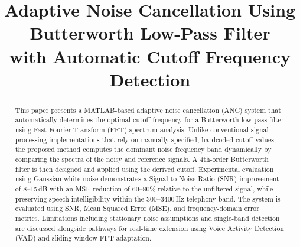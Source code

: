 \documentclass[conference]{IEEEtran}
\begin{document}
\title{Adaptive Noise Cancellation Using Butterworth Low-Pass Filter\\
with Automatic Cutoff Frequency Detection}

\author{
  \and
  \and
}

\maketitle

\begin{abstract}
This paper presents a MATLAB-based adaptive noise cancellation (ANC) system
that automatically determines the optimal cutoff frequency for a Butterworth
low-pass filter using Fast Fourier Transform (FFT) spectrum analysis. Unlike
conventional signal-processing implementations that rely on manually
specified, hardcoded cutoff values, the proposed method computes the dominant
noise frequency band dynamically by comparing the spectra of the noisy and
reference signals. A 4th-order Butterworth filter is then designed and applied
using the derived cutoff. Experimental evaluation using Gaussian white noise
demonstrates a Signal-to-Noise Ratio (SNR) improvement of 8--15\,dB with an
MSE reduction of 60--80\% relative to the unfiltered signal, while preserving
speech intelligibility within the 300--3400\,Hz telephony band. The system is
evaluated using SNR, Mean Squared Error (MSE), and frequency-domain error
metrics. Limitations including stationary noise assumptions and single-band
detection are discussed alongside pathways for real-time extension using
Voice Activity Detection (VAD) and sliding-window FFT adaptation.
\end{abstract}
\end{document}
